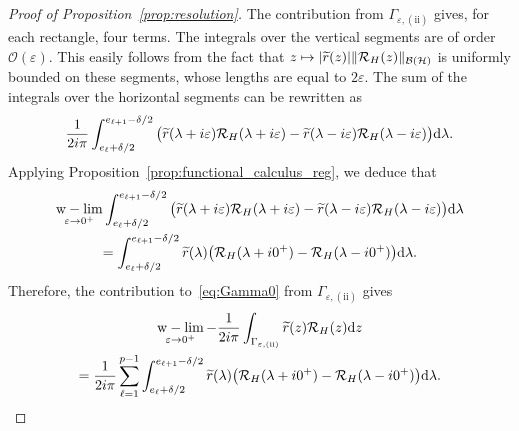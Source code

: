 \documentclass[10pt]{amsart}
\theoremstyle{definition}\newtheorem{defi}[theo]{Definition}\newtheorem{rema}[theo]{Remark}\newtheorem{exam}[theo]{Example}\newtheorem{exem}[theo]{Example}\newtheorem{nota}[theo]{Notation}
\newcommand{\Hi}{\mathcal{H}}
\newcommand{\rmd}{\mathrm{d}}
\newcommand{\Res}{\mathcal{R}}
\newcommand{\clB}{\mathcal{B}}
\DeclareMathOperator{\wlim}{w-lim}
\let\oldtilde\tilde
\renewcommand*{\tilde}[1]{\mathchoice{\widetilde{#1}}{\widetilde{#1}}{\oldtilde{#1}}{\oldtilde{#1}}}
\begin{document}
\begin{proof}[Proof of Proposition~\ref{prop:resolution}]
The contribution from $\Gamma_{\varepsilon,\mathrm{(ii)}}$ gives, for each rectangle, four terms. The integrals over the vertical segments are of order $\mathcal{O}(\varepsilon)$. This easily follows from the fact that $z\mapsto|\tilde r(z)|\|\Res_H(z)\|_{\clB(\Hi)}$ is uniformly bounded on these segments, whose lengths are equal to $2\varepsilon$. The sum of the integrals over the horizontal segments can be rewritten as
\begin{align*}
\frac{1}{2i\pi}\int_{e_\ell+\delta/2}^{e_{\ell+1}-\delta/2} \big(\tilde r(\lambda+i\varepsilon) \Res_H(\lambda+i\varepsilon) - \tilde r(\lambda-i\varepsilon) \Res_H(\lambda-i\varepsilon) \big) \rmd \lambda.
\end{align*}
Applying Proposition~\ref{prop:functional_calculus_reg}, we deduce that
\begin{multline*}
\wlim_{\varepsilon\rightarrow 0^+} \int_{e_\ell+\delta/2}^{e_{\ell+1}-\delta/2} \big(\tilde r(\lambda+i\varepsilon) \Res_H(\lambda+i\varepsilon) - \tilde r(\lambda-i\varepsilon) \Res_H(\lambda-i\varepsilon) \big)\rmd \lambda \\
= \int_{e_\ell+\delta/2}^{e_{\ell+1}-\delta/2} \tilde r(\lambda) \big(\Res_H(\lambda+i0^+) - \Res_H(\lambda-i0^+) \big) \rmd \lambda.
\end{multline*}
Therefore, the contribution to~\eqref{eq:Gamma0} from $\Gamma_{\varepsilon,\mathrm{(ii)}}$ gives
\begin{multline}\label{eq:Gamma2}
\wlim_{\varepsilon\rightarrow 0^+} - \frac{1}{2i\pi} \int_{\Gamma_{\varepsilon,\mathrm{(ii)}}}\tilde r(z) \Res_H(z) \rmd z \\
= \frac{1}{2i\pi} \sum_{\ell=1}^{p-1}\int_{e_\ell+\delta/2}^{e_{\ell+1}-\delta/2} \tilde r(\lambda) \big(\Res_H(\lambda+i0^+) - \Res_H(\lambda-i0^+) \big) \rmd \lambda. 
\end{multline}


\end{proof}
\end{document}

